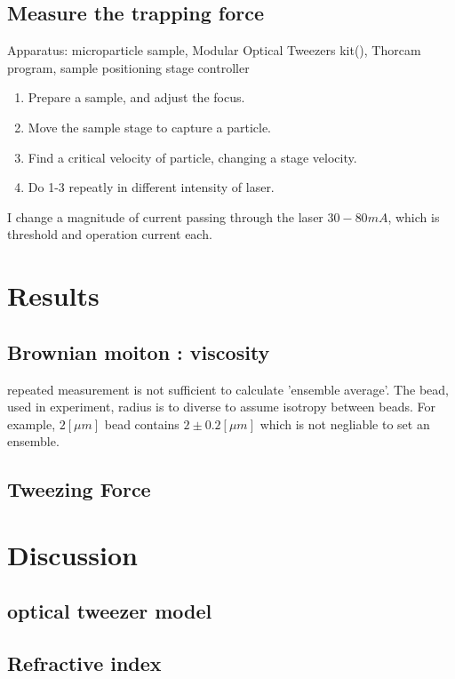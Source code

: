 \documentclass{article}
\begin{document}
\subsection{Measure the trapping force}
\noindent
Apparatus:
microparticle sample, Modular Optical Tweezers kit(\cite{opticaltweezermodule}), Thorcam program, sample positioning stage controller

\begin{enumerate}
    \item Prepare a sample, and adjust the focus.
    \item Move the sample stage to capture a particle.
    \item Find a critical velocity of particle, changing a stage velocity.
    \item Do 1-3 repeatly in different intensity of laser.
\end{enumerate}
I change a magnitude of current passing through the laser $30-80 mA$, which is threshold and operation current each.

\section{Results}
\subsection{Brownian moiton : viscosity}
\label{results:brownian_motion_raw_fig}
repeated measurement is not sufficient to calculate 'ensemble average'.
The bead, used in experiment, radius is to diverse to assume isotropy between beads.
For example, $2 [\mu m]$ bead contains $2 \pm 0.2 [\mu m]$ which is not negliable to set an ensemble.

\label{results:viscosity}
\label{results:modified_brownian_analysis}
\subsection{Tweezing Force}
\label{results:tweezing_force}

\section{Discussion}


\subsection{optical tweezer model}
\label{discussion:optical_tweezer_simulation}
\subsection{Refractive index}
\label{discussion:refractive_index_calculation}



\end{document}
